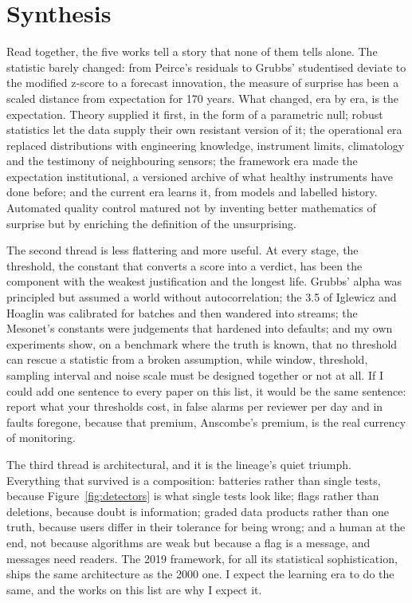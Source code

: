 \section{Synthesis}
\label{sec:synthesis}

Read together, the five works tell a story that none of them tells alone.
The statistic barely changed: from Peirce's residuals to Grubbs' studentised
deviate to the modified z-score to a forecast innovation, the measure of
surprise has been a scaled distance from expectation for 170 years. What
changed, era by era, is the expectation. Theory supplied it first, in the
form of a parametric null; robust statistics let the data supply their own
resistant version of it; the operational era replaced distributions with
engineering knowledge, instrument limits, climatology and the testimony of
neighbouring sensors; the framework era made the expectation institutional,
a versioned archive of what healthy instruments have done before; and the
current era learns it, from models and labelled history. Automated quality
control matured not by inventing better mathematics of surprise but by
enriching the definition of the unsurprising.

The second thread is less flattering and more useful. At every stage, the
threshold, the constant that converts a score into a verdict, has been the
component with the weakest justification and the longest life. Grubbs'
alpha was principled but assumed a world without autocorrelation; the 3.5 of
Iglewicz and Hoaglin was calibrated for batches and then wandered into
streams; the Mesonet's constants were judgements that hardened into
defaults; and my own experiments show, on a benchmark where the truth is
known, that no threshold can rescue a statistic from a broken assumption,
while window, threshold, sampling interval and noise scale must be designed
together or not at all. If I could add one sentence to every paper on this
list, it would be the same sentence: report what your thresholds cost, in
false alarms per reviewer per day and in faults foregone, because that
premium, Anscombe's premium, is the real currency of monitoring.

The third thread is architectural, and it is the lineage's quiet triumph.
Everything that survived is a composition: batteries rather than single
tests, because Figure~\ref{fig:detectors} is what single tests look like;
flags rather than deletions, because doubt is information; graded data
products rather than one truth, because users differ in their tolerance for
being wrong; and a human at the end, not because algorithms are weak but
because a flag is a message, and messages need readers. The 2019 framework,
for all its statistical sophistication, ships the same architecture as the
2000 one. I expect the learning era to do the same, and the works on this
list are why I expect it.

